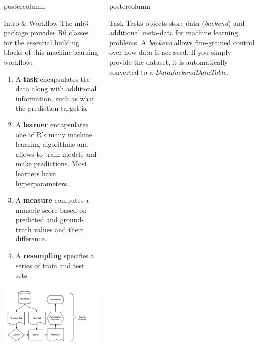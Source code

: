 \documentclass{beamer}
\newlength{\columnheight} %
\begin{document}
\begin{frame}[fragile]{}
\begin{columns}
\begin{column}{.245\textwidth}
\begin{beamercolorbox}[center]{postercolumn}
\begin{minipage}{.98\textwidth}
{					\begin{myblock}{Intro \& Workflow}
					The mlr3 package provides R6 classes for the essential building
					blocks of this machine learning workflow:
					\begin{enumerate}
						\item A \textbf{task} encapsulates the data along with additional information, such as 
						what the prediction target is.
						\item A \textbf{learner} encapsulates one of R's many machine learning algorithms and allows to train models and make predictions. Most learners have hyperparameters.
						\item A \textbf{measure} computes a numeric score based on predicted and ground-truth values and their difference.
						\item A \textbf{resampling} specifies a series of train and test sets.
					\end{enumerate}
          \end{myblock}
				  \includegraphics[width=\textwidth]{img/ml_abstraction.png}
				}
			\end{minipage}
		\end{beamercolorbox}
	\end{column}
	\begin{column}{.245\textwidth}
		\begin{beamercolorbox}[center]{postercolumn}
			\begin{minipage}{.98\textwidth}
				\parbox[t][\columnheight]{\textwidth}{
				  \begin{myblock}{Task}
						Tasks objects store data (\textit{backend}) and additional meta-data for machine learning problems. A \textit{backend} allows fine-grained control over how data is accessed. If you simply provide the dataset, it is automatically converted to a \textit{DataBackendDataTable}.

\end{myblock}}
\end{minipage}
\end{beamercolorbox}
\end{column}
\end{columns}
\end{frame}
\end{document}
